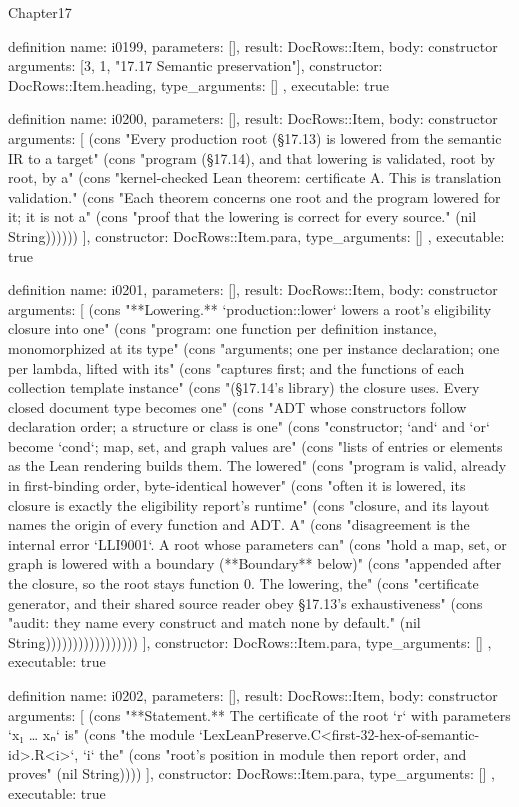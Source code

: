 \begin{lexlean}{Chapter17}
\begin{semanticmodule}
definition{
  name: i0199,
  parameters: [],
  result: DocRows::Item,
  body: constructor{
    arguments: [3, 1, "17.17 Semantic preservation"],
    constructor: DocRows::Item.heading,
    type_arguments: []
  },
  executable: true
}

definition{
  name: i0200,
  parameters: [],
  result: DocRows::Item,
  body: constructor{
    arguments: [
      (cons "Every production root (§17.13) is lowered from the semantic IR to a target" (cons "program (§17.14), and that lowering is validated, root by root, by a" (cons "kernel-checked Lean theorem: certificate A. This is translation validation." (cons "Each theorem concerns one root and the program lowered for it; it is not a" (cons "proof that the lowering is correct for every source." (nil String))))))
    ],
    constructor: DocRows::Item.para,
    type_arguments: []
  },
  executable: true
}

definition{
  name: i0201,
  parameters: [],
  result: DocRows::Item,
  body: constructor{
    arguments: [
      (cons "**Lowering.** `production::lower` lowers a root's eligibility closure into one" (cons "program: one function per definition instance, monomorphized at its type" (cons "arguments; one per instance declaration; one per lambda, lifted with its" (cons "captures first; and the functions of each collection template instance" (cons "(§17.14's library) the closure uses. Every closed document type becomes one" (cons "ADT whose constructors follow declaration order; a structure or class is one" (cons "constructor; `and` and `or` become `cond`; map, set, and graph values are" (cons "lists of entries or elements as the Lean rendering builds them. The lowered" (cons "program is valid, already in first-binding order, byte-identical however" (cons "often it is lowered, its closure is exactly the eligibility report's runtime" (cons "closure, and its layout names the origin of every function and ADT. A" (cons "disagreement is the internal error `LLI9001`. A root whose parameters can" (cons "hold a map, set, or graph is lowered with a boundary (**Boundary** below)" (cons "appended after the closure, so the root stays function 0. The lowering, the" (cons "certificate generator, and their shared source reader obey §17.13's exhaustiveness" (cons "audit: they name every construct and match none by default." (nil String)))))))))))))))))
    ],
    constructor: DocRows::Item.para,
    type_arguments: []
  },
  executable: true
}

definition{
  name: i0202,
  parameters: [],
  result: DocRows::Item,
  body: constructor{
    arguments: [
      (cons "**Statement.** The certificate of the root `r` with parameters `x₁ … xₙ` is" (cons "the module `LexLeanPreserve.C<first-32-hex-of-semantic-id>.R<i>`, `i` the" (cons "root's position in module then report order, and proves" (nil String))))
    ],
    constructor: DocRows::Item.para,
    type_arguments: []
  },
  executable: true
}


\end{semanticmodule}
\end{lexlean}
